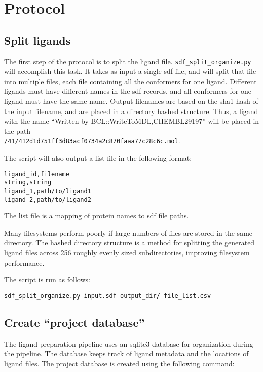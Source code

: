 \section{Protocol}

\subsection{Split ligands}

The first step of the protocol is to split the ligand file.
\texttt{sdf\_split\_organize.py} will accomplish this task. 
It takes as input a single sdf file, and will split that file into multiple files, each file containing all the conformers for one ligand.
Different ligands must have different names in the sdf records, and all conformers for one ligand must have the same name. 
Output filenames are based on the sha1 hash of the input filename, and are placed in a directory hashed structure.
Thus, a ligand with the name ``Written by BCL::WriteToMDL,CHEMBL29197''
will be placed in the path\\
\texttt{/41/412d1d751ff3d83acf0734a2c870faaa77c28c6c.mol}.

The script will also output a list file in the following format:

\begin{verbatim}
ligand_id,filename
string,string
ligand_1,path/to/ligand1
ligand_2,path/to/ligand2
\end{verbatim}

The list file is a mapping of protein names to sdf file paths.

Many filesystems perform poorly if large numbers of files are stored in the same directory. 
The hashed directory structure is a method for splitting the generated ligand files across 256 roughly evenly sized subdirectories, improving filesystem performance.

The script is run as follows:

\begin{verbatim}
sdf_split_organize.py input.sdf output_dir/ file_list.csv
\end{verbatim}

\subsection{Create ``project database''}

The ligand preparation pipeline uses an sqlite3 database for organization during the pipeline.
The database keeps track of ligand metadata and the locations of ligand files.
The project database is created using the following command:

